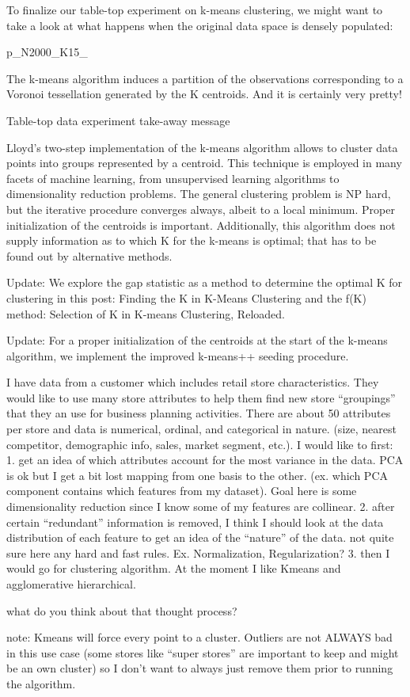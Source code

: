 To finalize our table-top experiment on k-means clustering, we might want to take a look at what happens when the original data space is densely populated:

p_N2000_K15_

The k-means algorithm induces a partition of the observations corresponding to a Voronoi tessellation generated by the K centroids. And it is certainly very pretty!

Table-top data experiment take-away message

Lloyd’s two-step implementation of the k-means algorithm allows to cluster data points into groups represented by a centroid. This technique is employed in many facets of machine learning, from unsupervised learning algorithms to dimensionality reduction problems. The general clustering problem is NP hard, but the iterative procedure converges always, albeit to a local minimum. Proper initialization of the centroids is important. Additionally, this algorithm does not supply information as to which K for the k-means is optimal; that has to be found out by alternative methods.

Update: We explore the gap statistic as a method to determine the optimal K for clustering in this post: Finding the K in K-Means Clustering and the f(K) method: Selection of K in K-means Clustering, Reloaded.

Update: For a proper initialization of the centroids at the start of the k-means algorithm, we implement the improved k-means++ seeding procedure.



I have data from a customer which includes retail store characteristics. They would like to use many store attributes to help them find new store “groupings” that they an use for business planning activities. There are about 50 attributes per store and data is numerical, ordinal, and categorical in nature. (size, nearest competitor, demographic info, sales, market segment, etc.). I would like to first:
1. get an idea of which attributes account for the most variance in the data. PCA is ok but I get a bit lost mapping from one basis to the other. (ex. which PCA component contains which features from my dataset). Goal here is some dimensionality reduction since I know some of my features are collinear.
2. after certain “redundant” information is removed, I think I should look at the data distribution of each feature to get an idea of the “nature” of the data. not quite sure here any hard and fast rules. Ex. Normalization, Regularization?
3. then I would go for clustering algorithm. At the moment I like Kmeans and agglomerative hierarchical.

what do you think about that thought process?

note: Kmeans will force every point to a cluster. Outliers are not ALWAYS bad in this use case (some stores like “super stores” are important to keep and might be an own cluster) so I don’t want to always just remove them prior to running the algorithm.

